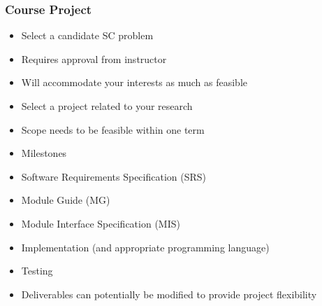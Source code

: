 \documentclass[t,12pt,numbers,fleqn]{beamer}
\begin{document}

\begin{frame}
\frametitle{Course Project}

\begin {itemize}

\item Select a candidate SC problem
\bi
\item Requires approval from instructor
\item Will accommodate your interests as much as feasible
\item Select a project related to your research
\item Scope needs to be feasible within one term
\ei
\item Milestones
\be
\item Software Requirements Specification (SRS)
\item Module Guide (MG)
\item Module Interface Specification (MIS)
\item Implementation (and appropriate programming language)
\item Testing
\ee
\item Deliverables can potentially be modified to provide project flexibility
\end {itemize}

\end{frame}

\end{document}

